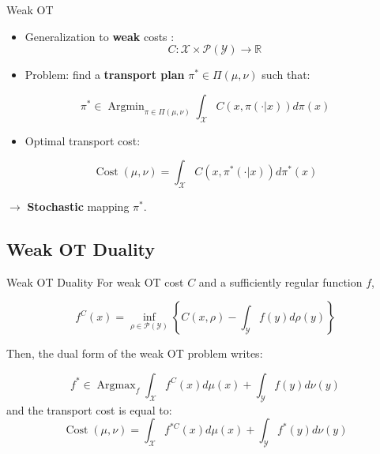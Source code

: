 \documentclass[aspectratio=169]{beamer}
\newcommand{\R}{\mathbb{R}}
\DeclareMathOperator*{\Argmin}{\text{Argmin}}
\DeclareMathOperator*{\Argmax}{\text{Argmax}}
\DeclareMathOperator*{\Cost}{\text{Cost}}
\begin{document}
\begin{frame}{Weak OT}
    \begin{itemize}
        \item Generalization to \textbf{weak} costs :
              $$C: \mathcal{X}\times \mathcal{P}(\mathcal{Y})\to\R$$
        \item Problem: find a \textbf{transport plan} $\pi^*\in \Pi(\mu,\nu)$ such that:
    \end{itemize}
    \begin{equation}
        \pi^* \in \Argmin_{\pi\in\Pi(\mu,\nu)} \int_{\mathcal{X}} C(x,\pi(\cdot|x))d\pi(x)
    \end{equation}
    \begin{itemize}
        \item Optimal transport cost:
    \end{itemize}
    \begin{equation}
        \Cost(\mu,\nu) = \int_{\mathcal{X}} C(x,\pi^*(\cdot|x))d\pi^*(x)
    \end{equation}

    $\rightarrow$ \textbf{Stochastic} mapping $\pi^*$.
\end{frame}

\subsection{Weak OT Duality}
\begin{frame}{Weak OT Duality}
    For weak OT cost $C$ and a sufficiently regular function $f$,

    \begin{equation}
        f^C(x) = \inf_{\rho\in \mathcal{P}(\mathcal{Y})} \left\{C(x,\rho)-\int_{\mathcal{Y}}f(y)d\rho(y)\right\}
    \end{equation}

    Then, the dual form of the weak OT problem writes:

    \begin{equation}
        f^*\in\Argmax_{f} \int_{\mathcal{X}} f^C(x)d\mu(x) + \int_{\mathcal{Y}} f(y)d\nu(y)
    \end{equation}
    and the transport cost is equal to:
    \begin{equation}
        \Cost(\mu,\nu) = \int_{\mathcal{X}} f^{*C}(x)d\mu(x) + \int_{\mathcal{Y}} f^*(y)d\nu(y)
    \end{equation}

\end{frame}
\end{document}
